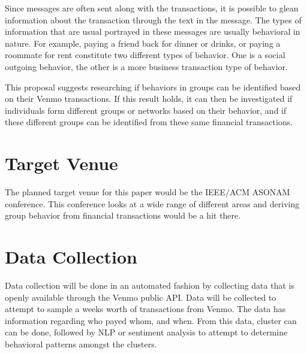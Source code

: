 \documentclass[jair,twoside,11pt,theapa]{article}
\begin{document}
Since messages are often sent along with the transactions, it is possible to glean information about the transaction through the text in the message. The types of information that are usual portrayed in these messages are usually behavioral in nature. For example, paying a friend back for dinner or drinks, or paying a roommate for rent constitute two different types of behavior. One is a social outgoing behavior, the other is a more business transaction type of behavior. 

This proposal suggests researching if behaviors in groups can be identified based on their Venmo transactions. If this result holds, it can then be investigated if individuals form different groups or networks based on their behavior, and if these different groups can be identified from these same financial transactions. 

\section{Target Venue}
The planned target venue for this paper would be the IEEE/ACM ASONAM conference. This conference looks at a wide range of different areas and deriving group behavior from financial transactions would be a hit there. 

\section{Data Collection}
Data collection will be done in an automated fashion by collecting data that is openly available through the Venmo public API. Data will be collected to attempt to sample a weeks worth of transactions from Venmo. The data has information regarding who payed whom, and when. From this data, cluster can can be done, followed by NLP or sentiment analysis to attempt to determine behavioral patterns amongst the clusters. 


\vskip 0.2in

\end{document}
